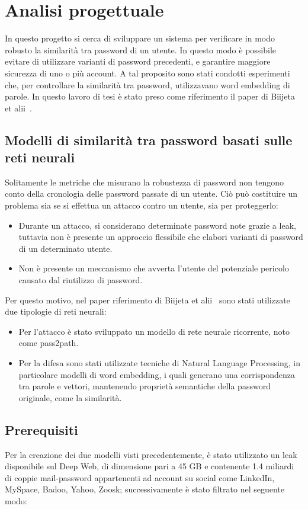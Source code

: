\chapter{Analisi progettuale}
\label{ch:analisi progettuale}

In questo progetto si cerca di sviluppare un sistema per verificare in modo robusto la similarità tra password di un utente. In questo modo è possibile evitare di utilizzare varianti di password precedenti, e garantire maggiore sicurezza di uno o più account.
A tal proposito sono stati condotti esperimenti che, per controllare la similarità tra password, utilizzavano word embedding di parole. In questo lavoro di tesi è stato preso come riferimento il paper di Biijeta  et alii~\cite{biijeta}.

\section{Modelli di similarità tra password basati sulle reti neurali}

Solitamente le metriche che misurano la robustezza di password non tengono conto della cronologia delle password passate di un utente.
Ciò può costituire un problema sia se si effettua un attacco contro un utente, sia per proteggerlo:
\begin{itemize}
    \item Durante un attacco, si considerano determinate password note grazie a leak, tuttavia non è presente un approccio flessibile che elabori varianti di password di un determinato utente.
    \item Non è presente un meccanismo che avverta l'utente del potenziale pericolo causato dal riutilizzo di password.
\end{itemize}
Per questo motivo, nel paper riferimento di Biijeta et alii~\cite{biijeta} sono stati utilizzate due tipologie di reti neurali:
\begin{itemize}
    \item Per l'attacco è stato sviluppato un modello di rete neurale ricorrente, noto come pass2path.
    \item Per la difesa sono stati utilizzate tecniche di Natural Language Processing, in particolare modelli di word embedding, i quali generano una corrispondenza tra parole e vettori, mantenendo proprietà semantiche della password originale, come la similarità.
\end{itemize}

\section{Prerequisiti}
Per la creazione dei due modelli visti precedentemente, è stato utilizzato un leak disponibile sul Deep Web, di dimensione pari a 45 GB e contenente 1.4 miliardi di coppie mail-password appartenenti ad account su social come LinkedIn, MySpace, Badoo, Yahoo, Zoosk; successivamente è stato filtrato nel seguente modo:

